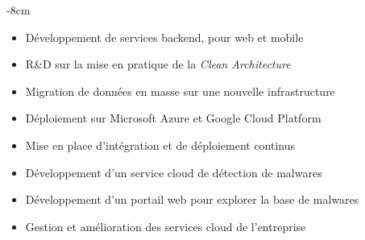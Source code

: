 \documentclass[10pt,a4paper]{altacv}
\begin{document}

\begin{adjustwidth}{}{-8cm}
\makecvheader
\end{adjustwidth}


\begin{itemize}
\item Développement de services backend, pour web et mobile
\item R\&D sur la mise en pratique de la \textit{Clean Architecture}
\item Migration de données en masse sur une nouvelle infrastructure
\item Déploiement sur Microsoft Azure et Google Cloud Platform 
\item Mise en place d'intégration et de déploiement continus
\end{itemize}

\divider

\begin{itemize}
\item Développement d'un service cloud de détection de malwares
\item Développement d'un portail web pour explorer la base de malwares
\item Gestion et amélioration des services cloud de l'entreprise
\end{itemize}
\end{document}

